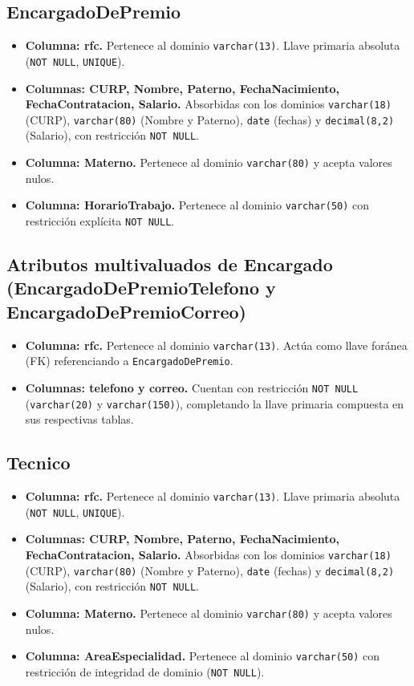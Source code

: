 \documentclass[11pt,letterpaper,spanish]{article}
\begin{document}
\subsection*{EncargadoDePremio}
\begin{itemize}
	\item \textbf{Columna: rfc.} Pertenece al dominio \texttt{varchar(13)}. Llave primaria absoluta (\texttt{NOT NULL}, \texttt{UNIQUE}).
	\item \textbf{Columnas: CURP, Nombre, Paterno, FechaNacimiento, FechaContratacion, Salario.} Absorbidas con los dominios \texttt{varchar(18)} (CURP), \texttt{varchar(80)} (Nombre y Paterno), \texttt{date} (fechas) y \texttt{decimal(8,2)} (Salario), con restricción \texttt{NOT NULL}.
	\item \textbf{Columna: Materno.} Pertenece al dominio \texttt{varchar(80)} y acepta valores nulos.
	\item \textbf{Columna: HorarioTrabajo.} Pertenece al dominio \texttt{varchar(50)} con restricción explícita \texttt{NOT NULL}.
\end{itemize}

\subsection*{Atributos multivaluados de Encargado (EncargadoDePremioTelefono y EncargadoDePremioCorreo)}
\begin{itemize}
	\item \textbf{Columna: rfc.} Pertenece al dominio \texttt{varchar(13)}. Actúa como llave foránea (FK) referenciando a \texttt{EncargadoDePremio}.
	\item \textbf{Columnas: telefono y correo.} Cuentan con restricción \texttt{NOT NULL} (\texttt{varchar(20)} y \texttt{varchar(150)}), completando la llave primaria compuesta en sus respectivas tablas.
\end{itemize}

\subsection*{Tecnico}
\begin{itemize}
	\item \textbf{Columna: rfc.} Pertenece al dominio \texttt{varchar(13)}. Llave primaria absoluta (\texttt{NOT NULL}, \texttt{UNIQUE}).
	\item \textbf{Columnas: CURP, Nombre, Paterno, FechaNacimiento, FechaContratacion, Salario.} Absorbidas con los dominios \texttt{varchar(18)} (CURP), \texttt{varchar(80)} (Nombre y Paterno), \texttt{date} (fechas) y \texttt{decimal(8,2)} (Salario), con restricción \texttt{NOT NULL}.
	\item \textbf{Columna: Materno.} Pertenece al dominio \texttt{varchar(80)} y acepta valores nulos.
	\item \textbf{Columna: AreaEspecialidad.} Pertenece al dominio \texttt{varchar(50)} con restricción de integridad de dominio (\texttt{NOT NULL}).
\end{itemize}
\end{document}
